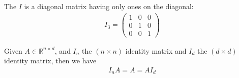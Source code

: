 \documentclass[letterpaper,10pt,english]{jupyterBook}
\begin{document}
\sphinxAtStartPar
The  \(I\) is a diagonal matrix having only ones on the diagonal:
\begin{equation*}
\begin{split}I_3 = \begin{pmatrix} 1 & 0 & 0\\ 0 & 1 & 0\\ 0& 0& 1 \end{pmatrix}\end{split}
\end{equation*}

\sphinxAtStartPar
Given \(A\in\mathbb{R}^{n\times d}\), and \(I_n\) the \((n\times n)\) identity matrix and \(I_d\) the \((d\times d)\) identity matrix, then we have
\begin{equation*}
\begin{split}I_n A = A = AI_d \end{split}
\end{equation*}
\end{document}
